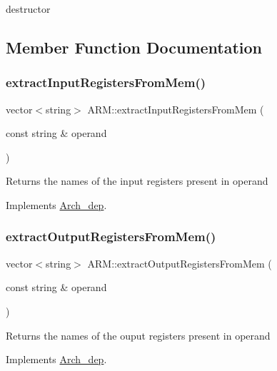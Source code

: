 destructor 

\subsection{Member Function Documentation}
\mbox{\label{classARM_a9e3c7c33a89377beca2b31ebacf2793c}} 
\subsubsection{\texorpdfstring{extract\+Input\+Registers\+From\+Mem()}{extractInputRegistersFromMem()}}
{\footnotesize\ttfamily vector$<$string$>$ A\+R\+M\+::extract\+Input\+Registers\+From\+Mem (\begin{DoxyParamCaption}\item[{const string \&}]{operand }\end{DoxyParamCaption})\hspace{0.3cm}{\ttfamily [virtual]}}

Returns the names of the input registers present in operand 

Implements \hyperlink{classArch__dep_a02bb8952fdf52e2a11ca009509b7bf46}{Arch\+\_\+dep}.

\mbox{\label{classARM_a4d2fbc77b15f4672ed20f06cc44e4c4e}} 
\subsubsection{\texorpdfstring{extract\+Output\+Registers\+From\+Mem()}{extractOutputRegistersFromMem()}}
{\footnotesize\ttfamily vector$<$string$>$ A\+R\+M\+::extract\+Output\+Registers\+From\+Mem (\begin{DoxyParamCaption}\item[{const string \&}]{operand }\end{DoxyParamCaption})\hspace{0.3cm}{\ttfamily [virtual]}}

Returns the names of the ouput registers present in operand 

Implements \hyperlink{classArch__dep_a4ef649eb06dedb67fe215fc7665f48ba}{Arch\+\_\+dep}.

